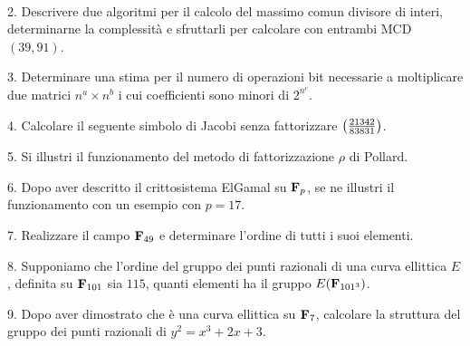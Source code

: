 \ \dotfill\ \bigskip\bigskip\bigskip\vfil\eject

\item{2.} Descrivere due algoritmi per il calcolo del massimo comun divisore di interi, determinarne la complessit\`a e sfruttarli
per calcolare con entrambi MCD$(39,91)$.\vv

\item{3.} Determinare una stima per il numero di operazioni bit necessarie a moltiplicare due matrici $n^a\times n^b$ 
i cui coefficienti sono minori di $2^{n^c}$.\vv

\item{4.} Calcolare il seguente simbolo di Jacobi senza fattorizzare
$\left({21342\over83831}\right)$.\ve\ \vs

\item{5.} Si illustri il funzionamento del metodo di fattorizzazione $\rho$ di  Pollard.\vv

\item{6.} Dopo aver descritto il crittosistema ElGamal su ${\bf F}_p$, se ne illustri il funzionamento con un esempio con $p = 17$.\vv

\item{7.} Realizzare il campo ${\bf F}_{49}$ e determinare l'ordine di tutti i suoi elementi.\ve\ \vs

\item{8.} Supponiamo che l'ordine del gruppo dei punti razionali di una curva ellittica $E$, definita su ${\bf F}_{101}$
sia $115$, quanti elementi ha il gruppo $E({\bf F}_{101^3})$.\vv

\item{9.} Dopo aver dimostrato che \`e una curva ellittica su ${\bf F}_7$, 
calcolare la struttura del gruppo dei punti razionali di $y^2 = x^3 + 2x + 3$.\ \vst\bye